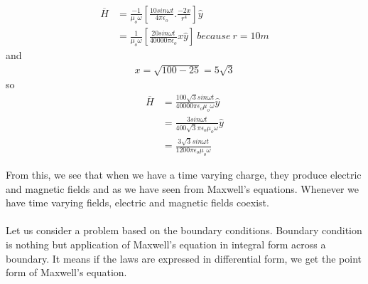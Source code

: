 \begin{exmp}
\begin{align*}
  \end{align*}
  \begin{align*}
  \overline{H} &= \frac{-1}{\mu_o\omega}\left[ \frac{10sin\omega t}{4\pi\epsilon_o}.\frac{-2x}{r^4}\right]\hat{y} \\
  &= \frac{1}{\mu_o\omega}\left[ \frac{20sin\omega t}{40000\pi\epsilon_o}x\hat{y}\right] \ because\ r = 10m 
  \end{align*}
  and
  \begin{align*}
  x = \sqrt{100 - 25} = 5\sqrt{3}
  \end{align*}
  so
  \begin{align*}
  \overline{H} &=  \frac{100\sqrt{3}sin\omega t}{40000\pi\epsilon_o\mu_o\omega}\hat{y}\\
  &= \frac{3sin\omega t}{400\sqrt{3}\pi\epsilon_o\mu_o\omega}\hat{y} \\
  &= \frac{3\sqrt{3}sin\omega t}{1200\pi\epsilon_o\mu_o\omega}
  \end{align*}
  \end{exmp}
  From this, we see that when we have a time varying charge, they produce electric and magnetic fields and as we have seen from Maxwell's equations. Whenever we have time varying fields, electric and magnetic fields coexist.\\ \\ 
  Let us consider a problem based on the boundary conditions. Boundary condition is nothing but application of Maxwell's equation in integral form across a boundary. It means if the laws are expressed in differential form, we get the point form of Maxwell's equation.
